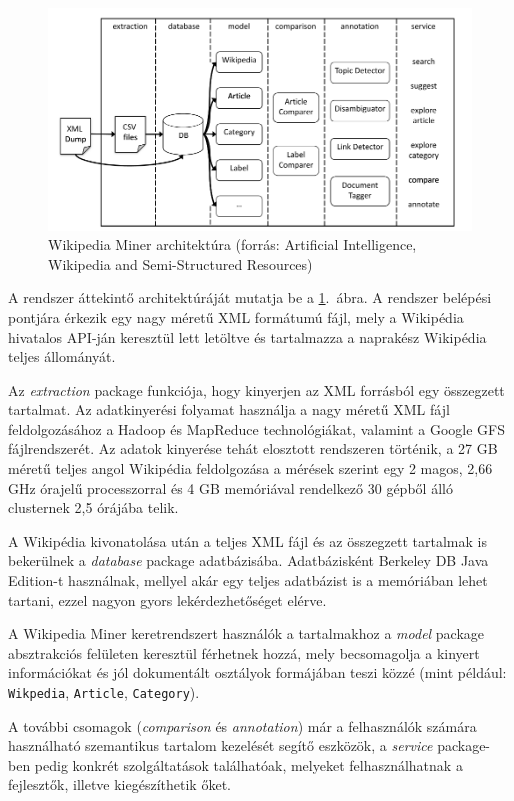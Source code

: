 \begin{figure}[htp]
\centering
\includegraphics[scale=0.4]{img/wikipediaminer}
\caption{Wikipedia Miner architektúra (forrás: Artificial Intelligence, Wikipedia and Semi-Structured Resources\cite{aijournal})}
\label{fig:wikipediaminer}
\end{figure}

A rendszer áttekintő architektúráját mutatja be a \ref{fig:wikipediaminer}.~ábra. A rendszer belépési pontjára érkezik egy nagy méretű XML formátumú fájl, mely a Wikipédia hivatalos API-ján keresztül lett letöltve és tartalmazza a naprakész Wikipédia teljes állományát.

Az \textit{extraction} package funkciója, hogy kinyerjen az XML forrásból egy összegzett tartalmat. Az adatkinyerési folyamat használja a nagy méretű XML fájl feldolgozásához a Hadoop és MapReduce technológiákat, valamint a Google GFS fájlrendszerét. Az adatok kinyerése tehát elosztott rendszeren történik, a 27 GB méretű teljes angol Wikipédia feldolgozása a mérések szerint egy 2 magos, 2,66 GHz órajelű processzorral és 4 GB memóriával rendelkező 30 gépből álló clusternek 2,5 órájába telik.

A Wikipédia kivonatolása után a teljes XML fájl és az összegzett tartalmak is bekerülnek a \textit{database} package adatbázisába. Adatbázisként Berkeley DB Java Edition-t használnak, mellyel akár egy teljes adatbázist is a memóriában lehet tartani, ezzel nagyon gyors lekérdezhetőséget elérve.

A Wikipedia Miner keretrendszert használók a tartalmakhoz a \textit{model} package absztrakciós felületen keresztül férhetnek hozzá, mely becsomagolja a kinyert információkat és jól dokumentált osztályok formájában teszi közzé (mint például: \texttt{Wikpedia}, \texttt{Article}, \texttt{Category}).

A további csomagok (\textit{comparison} és \textit{annotation}) már a felhasználók számára használható szemantikus tartalom kezelését segítő eszközök, a \textit{service} package-ben pedig konkrét szolgáltatások találhatóak, melyeket felhasználhatnak a fejlesztők, illetve kiegészíthetik őket.

